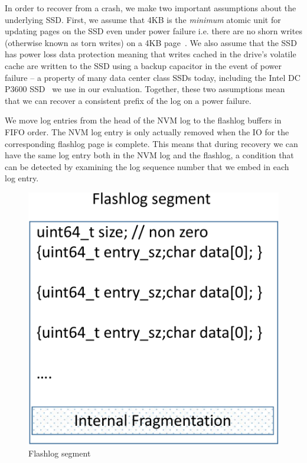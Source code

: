 \documentclass[letterpaper,twocolumn,10pt]{article}
\begin{document}
In order to recover from a crash, we make two important assumptions about the
underlying SSD. First, we assume that 4KB is the \emph{minimum} atomic unit for
updating pages on the SSD even under power failure i.e. there are no shorn
writes (otherwise known as torn writes) on a 4KB page~\cite{shorn_writes}. We
also assume that the SSD has power loss data protection meaning that writes
cached in the drive's volatile cache are written to the SSD using a backup
capacitor in the event of power failure -- a property of many data center class
SSDs today, including the Intel DC P3600 SSD~\cite{ssd_spec} we use in our
evaluation. Together, these two assumptions mean that we can recover a
consistent prefix of the log on a power failure.

We move log entries from the head of the NVM log to the flashlog buffers in FIFO
order. The NVM log entry is only actually removed when the IO for the
corresponding flashlog page is complete. This means that during recovery we can
have the same log entry both in the NVM log and the flashlog, a condition that
can be detected by examining the log sequence number that we embed in each log
entry.

\begin{figure}
  \centering
  \includegraphics[scale=0.4]{figures2/flashlog_page.pdf}
  \caption{Flashlog segment}
  \label{fig:flashlog_page}
\end{figure}
\end{document}

